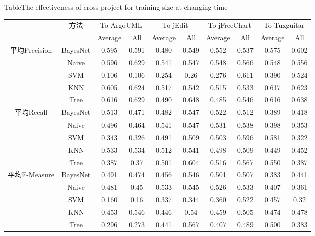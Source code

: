 \begin{table} [htbp]
{Table$\!$}{The effectiveness of cross-project for training size at changing time}
\vspace{0.5em}
\centering
\footnotesize
\begin{tabular}{cccccccccc}
\toprule[1.5pt]
~\multirow{2}{*}{指标}&\multirow{2}{*}{方法}&\multicolumn{2}{c}{To ArgoUML}&\multicolumn{2}{c}{To jEdit}&\multicolumn{2}{c}{To jFreeChart}&\multicolumn{2}{c}{To  Tuxguitar}\\
\cline{3-10}
~&~&{Average}&{All}&{Average}&{All}&{Average}&{All}&{Average}&{All}\\
\midrule[1pt]
\multirow{5}{*}{平均Precision}
&BayesNet&	0.595&	0.591&0.480&	0.549&	0.552&	0.537&	0.575&	0.602\\
&Naive&	0.596&	0.629	&0.541&	0.547&	0.548&	0.566&	0.548&	0.556\\
&SVM&	0.106&	0.106&	0.254&	0.26&	0.276	&0.611&	0.390&	0.524\\
&KNN&	0.605&	0.624&	0.517&	0.542&	0.515&	0.533&	0.617&	0.623\\
&Tree	&0.616&	0.629&	0.490&	0.648&	0.485	&0.546	&0.616	&0.638\\
\hline
\multirow{5}{*}{平均Recall}								
&BayesNet&	0.513&	0.471&	0.482&	0.547&	0.522	&0.512&	0.389	&0.418\\
&Naive&	0.496&	0.464&	0.541	&0.547&0.531	&0.538&0.398	&0.353\\
&SVM&	0.343&	0.326&	0.491&	0.509&	0.503&	0.596&	0.581&	0.322\\
&KNN&	0.533&	0.534&	0.512	&0.541&	0.498&	0.509&	0.449&	0.452\\
&Tree	&0.387&	0.37&	0.501	&0.604&	0.516&	0.567&	0.550&	0.387\\
\hline
\multirow{5}{*}{平均F-Measure}								
&BayesNet&	0.491	&0.474&	0.456&	0.546	&0.501&	0.507&	0.383	&0.441\\
&Naive&	0.481&	0.45&	0.533&	0.545&	0.526&	0.533&	0.407&	0.361\\
&SVM&	0.160	&0.16	&0.337	&0.344	&0.360	&0.522	&0.457	&0.32\\
&KNN&	0.453&	0.546	&0.446&	0.54&	0.459	&0.505	&0.474&	0.478\\
&Tree&	0.296	&0.273	&0.441&	0.567	&0.407&	0.489	&0.500&	0.383\\
\bottomrule[1.5pt]
\end{tabular}
\end{table}

